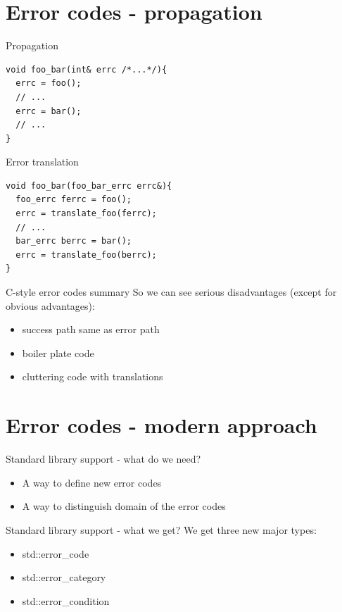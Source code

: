 \documentclass[10pt]{beamer}
\begin{document}
\section{Error codes - propagation}

\begin{frame}[fragile]{Propagation}
	\begin{verbatim}
void foo_bar(int& errc /*...*/){
  errc = foo();
  // ...
  errc = bar();		
  // ...
}
	\end{verbatim}
	
\end{frame}

\begin{frame}[fragile]{Error translation}
	\begin{verbatim}
void foo_bar(foo_bar_errc errc&){
  foo_errc ferrc = foo();
  errc = translate_foo(ferrc);
  // ...
  bar_errc berrc = bar();
  errc = translate_foo(berrc);
}
	\end{verbatim}
\end{frame}

\begin{frame}{C-style error codes summary}
	So we can see {\color{red}serious disadvantages} (except for {\color{blue}obvious advantages}):
	
	\begin{itemize}[<+- | alert@+>]
		\item success path same as error path
		\item boiler plate code
		\item cluttering code with translations
	\end{itemize}
\end{frame}
	

\section{Error codes - modern approach}
\begin{frame}{Standard library support - what do we need?}
	\begin{itemize}
		\item A way to define new error codes
		\item A way to distinguish domain of the error codes
	\end{itemize}
\end{frame}

\begin{frame}{Standard library support - what we get?}
	We get three new major types:
	\begin{itemize}
		\item std::error\_code
		\item std::error\_category
		\item std::error\_condition
	\end{itemize}
\end{frame}
	
\end{document}
